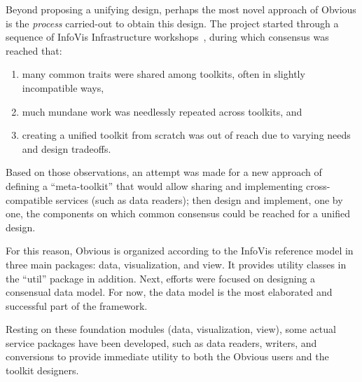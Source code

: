 Beyond proposing a unifying design, perhaps the most novel approach of
Obvious is the \emph{process} carried-out to obtain this design.  The
project started through a sequence of InfoVis Infrastructure
workshops~\cite{visinfrastructure2, vismaster2008,visinfrastructure1},
during which consensus was reached that:

\begin{enumerate}[noitemsep,topsep=0pt]
\item many common traits were shared among toolkits, often in slightly
  incompatible ways,
\item much mundane work was needlessly repeated across toolkits, and
\item creating a unified toolkit from scratch was out of reach due to
  varying needs and design tradeoffs.
\end{enumerate}

Based on those observations, an attempt was made for a new approach of
defining a ``meta-toolkit'' that would allow sharing and implementing
cross-compatible services (such as data readers); then design and
implement, one by one, the components on which common consensus could
be reached for a unified design.

For this reason, Obvious is organized according to the InfoVis
reference model in three main packages: data, visualization, and
view. It provides utility classes in the ``util'' package in addition.
Next, efforts were focused on designing a consensual data model. For
now, the data model is the most elaborated and successful part of the
framework.

Resting on these foundation modules (data, visualization, view), some
actual service packages have been developed, such as data readers,
writers, and conversions to provide immediate utility to both the
Obvious users and the toolkit designers.

